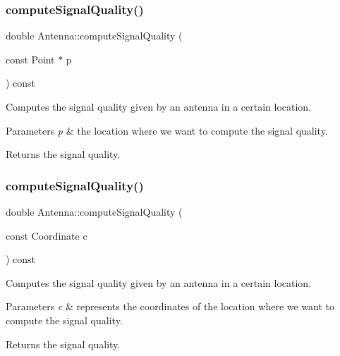 \subsubsection{\texorpdfstring{compute\+Signal\+Quality()}{computeSignalQuality()}\hspace{0.1cm}{\footnotesize\ttfamily [1/2]}}
{\footnotesize\ttfamily double Antenna\+::compute\+Signal\+Quality (\begin{DoxyParamCaption}\item[{const Point $\ast$}]{p }\end{DoxyParamCaption}) const}

Computes the signal quality given by an antenna in a certain location. 
\begin{DoxyParams}{Parameters}
{\em p} & the location where we want to compute the signal quality. \\
\hline
\end{DoxyParams}
\begin{DoxyReturn}{Returns}
the signal quality. 
\end{DoxyReturn}
\mbox{\label{class_antenna_ae49556bd6046b34a1dc1925d594783a2}} 
\subsubsection{\texorpdfstring{compute\+Signal\+Quality()}{computeSignalQuality()}\hspace{0.1cm}{\footnotesize\ttfamily [2/2]}}
{\footnotesize\ttfamily double Antenna\+::compute\+Signal\+Quality (\begin{DoxyParamCaption}\item[{const Coordinate}]{c }\end{DoxyParamCaption}) const}

Computes the signal quality given by an antenna in a certain location. 
\begin{DoxyParams}{Parameters}
{\em c} & represents the coordinates of the location where we want to compute the signal quality. \\
\hline
\end{DoxyParams}
\begin{DoxyReturn}{Returns}
the signal quality. 
\end{DoxyReturn}
\mbox{\label{class_antenna_a0bba3b0a586d5dc36397c2b9887cd42b}} 
